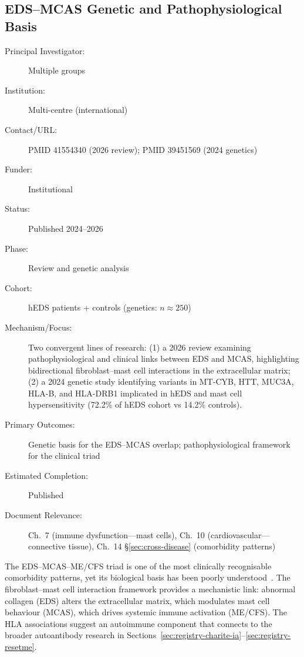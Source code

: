 \subsection{EDS--MCAS Genetic and Pathophysiological Basis}
\label{sec:registry-eds-mcas}

\begin{description}
    \item[Principal Investigator:] Multiple groups
    \item[Institution:] Multi-centre (international)
    \item[Contact/URL:] PMID 41554340 (2026 review); PMID 39451569 (2024
        genetics)
    \item[Funder:] Institutional
    \item[Status:] Published 2024--2026
    \item[Phase:] Review and genetic analysis
    \item[Cohort:] hEDS patients + controls (genetics: $n \approx 250$)
    \item[Mechanism/Focus:] Two convergent lines of research: (1) a 2026
        review examining pathophysiological and clinical links between EDS
        and MCAS, highlighting bidirectional fibroblast--mast cell
        interactions in the extracellular matrix; (2) a 2024 genetic study
        identifying variants in MT-CYB, HTT, MUC3A, HLA-B, and HLA-DRB1
        implicated in hEDS and mast cell hypersensitivity (72.2\% of hEDS
        cohort vs 14.2\% controls).
    \item[Primary Outcomes:] Genetic basis for the EDS--MCAS overlap;
        pathophysiological framework for the clinical triad
    \item[Estimated Completion:] Published
    \item[Document Relevance:] Ch.~7 (immune dysfunction---mast cells),
        Ch.~10 (cardiovascular---connective tissue), Ch.~14
        \S\ref{sec:cross-disease} (comorbidity patterns)
\end{description}

The EDS--MCAS--ME/CFS triad is one of the most clinically recognisable
comorbidity patterns, yet its biological basis has been poorly
understood~\cite{EDSMCAS2026review, hEDSgenetics2024MCAS}.  The
fibroblast--mast cell interaction framework provides a mechanistic link:
abnormal collagen (EDS) alters the extracellular matrix, which modulates
mast cell behaviour (MCAS), which drives systemic immune activation
(ME/CFS).  The HLA associations suggest an autoimmune component that
connects to the broader autoantibody research in
Sections~\ref{sec:registry-charite-ia}--\ref{sec:registry-resetme}.

